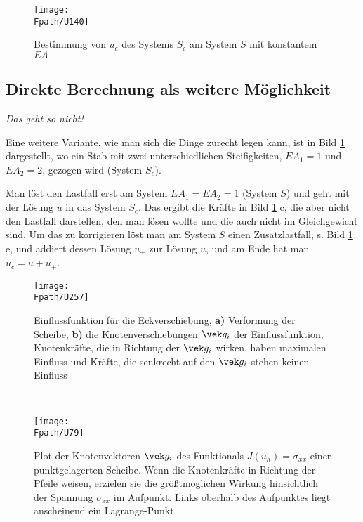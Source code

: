 {{{{%
\begin{figure}
\centering
\if {} \sidecaption \fi
{\texttt{[image: \\Fpath/U140]}}
\caption{Bestimmung von $u_c$ des Systems $S_c$ am System $S$ mit konstantem $EA$}
\label{U140}%
%
\end{figure}%

\textcolor{blau2}{\subsection{Direkte Berechnung als weitere M\"{o}glichkeit}}
{\em Das geht so nicht!\/}

Eine weitere Variante, wie man sich die Dinge zurecht legen kann, ist in Bild \ref{U140} dargestellt, wo ein Stab mit zwei unterschiedlichen Steifigkeiten, $EA_1 = 1$ und $EA_2 = 2$, gezogen wird (System $S_c$).

Man l\"{o}st den Lastfall erst am System $EA_1 = EA_2 = 1$ (System $S$) und geht mit der L\"{o}sung $u$ in das System $S_c$. Das ergibt die Kr\"{a}fte in Bild \ref{U140} c, die aber nicht den Lastfall darstellen, den man l\"{o}sen wollte und die auch nicht im Gleichgewicht sind. Um das zu korrigieren l\"{o}st man am System $S$  einen Zusatzlastfall, s. Bild \ref{U140} e, und addiert dessen L\"{o}sung $u_+$ zur L\"{o}sung $u$, und am Ende hat man $u_c = u + u_+$.

\begin{figure}
\centering
{\texttt{[image: \\Fpath/U257]}}
  \caption{Einflussfunktion f\"{u}r die Eckverschiebung, \textbf{a)} Verformung der Scheibe, \textbf{b)} die Knotenverschiebungen $\vek g_i$ der Einflussfunktion, Knotenkr\"{a}fte, die in Richtung der $\vek g_i$ wirken, haben maximalen Einfluss und Kr\"{a}fte, die senkrecht auf den $\vek g_i$ stehen keinen Einfluss} \label{U257}
\end{figure}\\


\begin{figure}
\centering
{\texttt{[image: \\Fpath/U79]}}
  \caption{Plot der Knotenvektoren  $\vek g_i$ des Funktionals $J(u_h) = \sigma_{xx}$ einer punktgelagerten Scheibe. Wenn die Knotenkr\"{a}fte in Richtung der Pfeile weisen, erzielen sie die gr\"{o}{\ss}tm\"{o}glichen Wirkung hinsichtlich der Spannung $\sigma_{xx}$ im Aufpunkt. Links oberhalb des Aufpunktes liegt anscheinend ein Lagrange-Punkt}
  \label{U79}
\end{figure}

}}}}
